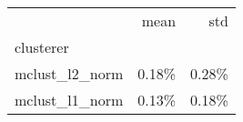 \begin{tabular}{lrr}
\toprule
{} &  mean &   std \\
clusterer      &       &       \\
\midrule
mclust\_l2\_norm & 0.18\% & 0.28\% \\
mclust\_l1\_norm & 0.13\% & 0.18\% \\
\bottomrule
\end{tabular}

